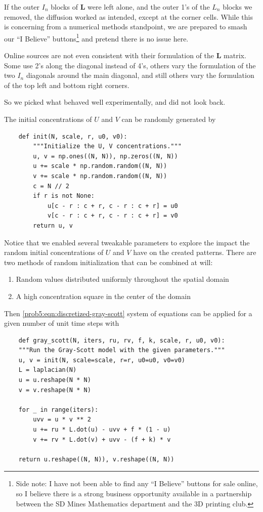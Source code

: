 If the outer $I_n$ blocks of $\mathbf L$ were left alone, and the outer 1's of the $L_n$ blocks we removed, the diffusion worked as intended, except at the corner cells.
While this is concerning from a numerical methods standpoint, we are prepared to smash our ``I Believe'' buttons\footnote{Side note: I have not been able to find any ``I Believe'' buttons for sale online, so I believe\texttrademark{} there is a strong business opportunity available in a partnership between the SD Mines Mathematics department and the 3D printing club.} and pretend there is no issue here.

Online sources are not even consistent with their formulation of the $\mathbf L$ matrix.
Some use 2's along the diagonal instead of 4's, others vary the formulation of the two $I_n$ diagonals around the main diagonal, and still others vary the formulation of the top left and bottom right corners.

So we picked what behaved well experimentally, and did not look back.

The initial concentrations of $U$ and $V$ can be randomly generated by
\begin{verbatim}
    def init(N, scale, r, u0, v0):
        """Initialize the U, V concentrations."""
        u, v = np.ones((N, N)), np.zeros((N, N))
        u += scale * np.random.random((N, N))
        v += scale * np.random.random((N, N))
        c = N // 2
        if r is not None:
            u[c - r : c + r, c - r : c + r] = u0
            v[c - r : c + r, c - r : c + r] = v0
        return u, v
\end{verbatim}
Notice that we enabled several tweakable parameters to explore the impact the random initial concentrations of $U$ and $V$ have on the created patterns.
There are two methods of random initialization that can be combined at will:
\begin{enumerate}
    \item Random values distributed uniformly throughout the spatial domain
    \item A high concentration square in the center of the domain
\end{enumerate}

Then \autoref{prob5:eqn:discretized-gray-scott} system of equations can be applied for a given number of unit time steps with
\begin{verbatim}
    def gray_scott(N, iters, ru, rv, f, k, scale, r, u0, v0):
    """Run the Gray-Scott model with the given parameters."""
    u, v = init(N, scale=scale, r=r, u0=u0, v0=v0)
    L = laplacian(N)
    u = u.reshape(N * N)
    v = v.reshape(N * N)

    for _ in range(iters):
        uvv = u * v ** 2
        u += ru * L.dot(u) - uvv + f * (1 - u)
        v += rv * L.dot(v) + uvv - (f + k) * v

    return u.reshape((N, N)), v.reshape((N, N))
\end{verbatim}

